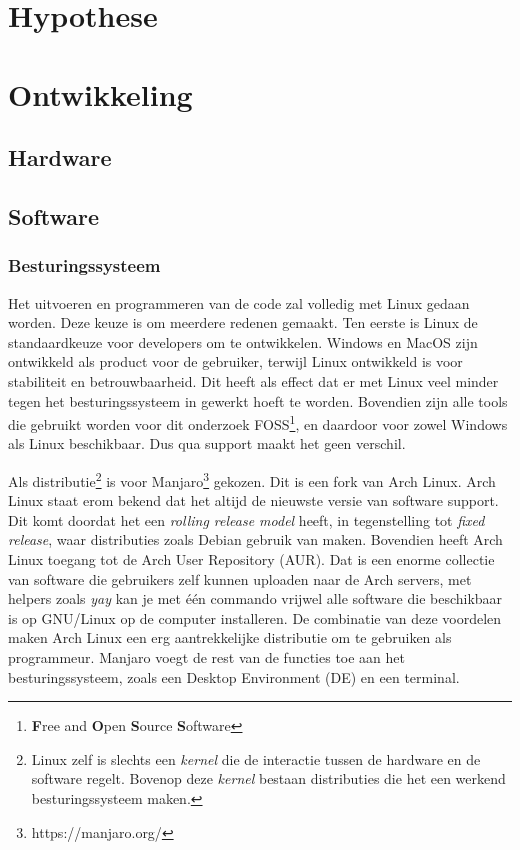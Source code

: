 \documentclass[12pt, a4paper]{article}
\begin{document}
\section{Hypothese}
\clearpage
\section{Ontwikkeling}
\subsection{Hardware}
\subsection{Software}
\subsubsection{Besturingssysteem}
Het uitvoeren en programmeren van de code zal volledig met Linux gedaan worden. Deze keuze is om meerdere redenen gemaakt. Ten eerste is Linux de standaardkeuze voor developers om te ontwikkelen. Windows en MacOS zijn ontwikkeld als product voor de gebruiker, terwijl Linux ontwikkeld is voor stabiliteit en betrouwbaarheid. Dit heeft als effect dat er met Linux veel minder tegen het besturingssysteem in gewerkt hoeft te worden. Bovendien zijn alle tools die gebruikt worden voor dit onderzoek FOSS\footnote{\textbf{F}ree and \textbf{O}pen \textbf{S}ource \textbf{S}oftware}, en daardoor voor zowel Windows als Linux beschikbaar. Dus qua support maakt het geen verschil.

Als distributie\footnote{Linux zelf is slechts een \emph{kernel} die de interactie tussen de hardware en de software regelt. Bovenop deze \emph{kernel} bestaan distributies die het een werkend besturingssysteem maken.} is voor Manjaro\footnote{https://manjaro.org/} gekozen. Dit is een fork van Arch Linux. Arch Linux staat erom bekend dat het altijd de nieuwste versie van software support. Dit komt doordat het een \emph{rolling release model} heeft, in tegenstelling tot \emph{fixed release}, waar distributies zoals Debian gebruik van maken. Bovendien heeft Arch Linux toegang tot de Arch User Repository (AUR). Dat is een enorme collectie van software die gebruikers zelf kunnen uploaden naar de Arch servers, met helpers zoals \emph{yay} kan je met één commando vrijwel alle software die beschikbaar is op GNU/Linux op de computer installeren. De combinatie van deze voordelen maken Arch Linux een erg aantrekkelijke distributie om te gebruiken als programmeur. Manjaro voegt de rest van de functies toe aan het besturingssysteem, zoals een Desktop Environment (DE) en een terminal.
\end{document}
